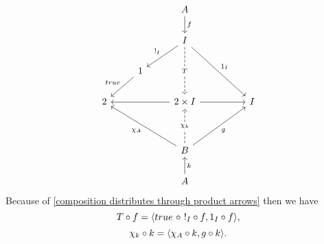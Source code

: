 \begin{exercise}
        \[\begin{tikzcd}
            && {A} \\
            && {I} \\
            & {1} \\
            {2} && {2 \times I} && {I} \\
            \\
            && {B} && {} \\
            && {A}
            \arrow[from=4-3, to=4-1]
            \arrow[from=4-3, to=4-5]
            \arrow["{!_I}"', from=2-3, to=3-2]
            \arrow["{true}"', from=3-2, to=4-1]
            \arrow["{1_I}", from=2-3, to=4-5]
            \arrow["{g}"', from=6-3, to=4-5]
            \arrow["{\chi_A}", from=6-3, to=4-1]
            \arrow["{\chi_k}" description, from=6-3, to=4-3, dashed]
            \arrow["{T}" description, from=2-3, to=4-3, dashed]
            \arrow["{f}", from=1-3, to=2-3]
            \arrow["{k}"', from=7-3, to=6-3]
        \end{tikzcd}\]
        Because of \cref{composition distributes through product arrows} then we have
        $$T \circ f = \langle true \ \circ \ !_I \circ f, 1_I \circ f \rangle,$$
        $$\chi_k \circ k = \langle \chi_A \circ k, g \circ k \rangle.$$


\end{exercise}

